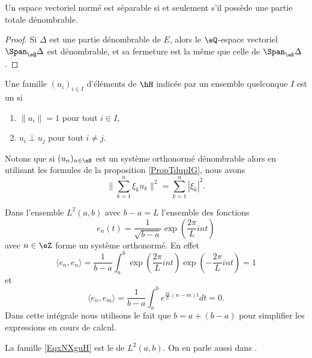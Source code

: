 \begin{proposition}     \label{PROPooZMWHooVwvNBY}
    Un espace vectoriel normé est séparable si et seulement s'il possède une partie totale dénombrable.
\end{proposition}

\begin{proof}
    Si \( \Delta\) est une partie dénombrable de \( E\), alors le \( \eQ\)-espace vectoriel \( \Span_{\eQ}\Delta\) est dénombrable, et sa fermeture est la même que celle de \( \Span_{\eK}\Delta\).
\end{proof}

\begin{definition}
    Une famille \( (u_i)_{i\in I}\) d'éléments de \( \hH\) indicée par un ensemble quelconque \( I\) est un 
     si
    \begin{enumerate}
        \item
            \( \| u_i \|=1\) pour tout \( i\in I\),
        \item
            \( u_i\perp u_j\) pour tout \( i\neq j\).
    \end{enumerate}
\end{definition}
Notons que si \( (u_n)_{n\in \eN}\) est un système orthonormé dénombrable alors en utilisant les formules de la proposition \ref{PropTdupIG}, nous avons
\begin{equation}    \label{EqCLQbMy}
    \big\| \sum_{k=1}^n\xi_ku_k \big\|^2=\sum_{k=1}^n| \xi_k |^2.
\end{equation}

\begin{example}
    Dans l'ensemble \( L^2(a,b)\) avec \( b-a=L\) l'ensemble des fonctions
    \begin{equation}        \label{EqxNXguH}
        e_n(t)=\frac{1}{ \sqrt{b-a} }\exp(\frac{ 2\pi }{ L }int)
    \end{equation}
    avec \( n\in \eZ\) forme un système orthonormé. En effet
    \begin{equation}
        \langle e_n, e_n\rangle =\frac{1}{ b-a }\int_a^b\exp(\frac{ 2\pi }{ L }int)\exp(-\frac{ 2\pi }{ L }int)=1
    \end{equation}
    et
    \begin{equation}
        \langle e_n, e_m\rangle =\frac{1}{ b-a }\int_a^b e^{\frac{ 2\pi }{ L }(n-m)t}dt=0.
    \end{equation}
    Dans cette intégrale nous utilisons le fait que \( b=a+(b-a)\) pour simplifier les expressions en cours de calcul.

    La famille \eqref{EqxNXguH} est le  de \( L^2(a,b)\). On en parle aussi dans \cite{KuttlerTopInAl}.
\end{example}

